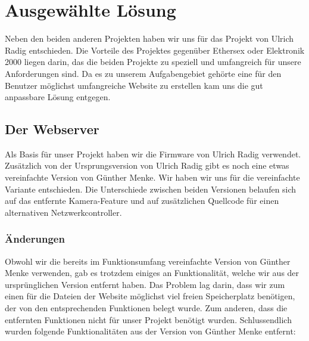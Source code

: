 \chapter{Ausgewählte Lösung}

Neben den beiden anderen Projekten haben wir uns für das Projekt von Ulrich
Radig entschieden. Die Vorteile des Projektes gegenüber Ethersex oder Elektronik
2000 liegen darin, das die beiden Projekte zu speziell und umfangreich für unsere
Anforderungen sind. Da es zu unserem Aufgabengebiet gehörte eine für den
Benutzer möglichst umfangreiche Website zu erstellen kam uns die gut anpassbare
Lösung entgegen.

\section{Der Webserver}

Als Basis für unser Projekt haben wir die Firmware von Ulrich Radig verwendet.
Zusätzlich von der Ursprungsversion von Ulrich Radig gibt es noch eine etwas
vereinfachte Version von Günther Menke. Wir haben wir uns für die vereinfachte
Variante entschieden. Die Unterschiede zwischen beiden
Versionen belaufen sich auf das entfernte Kamera-Feature und auf
zusätzlichen Quellcode für einen alternativen Netzwerkcontroller.

\subsection{Änderungen}

Obwohl wir die bereits im Funktionsumfang vereinfachte Version
von Günther Menke verwenden, gab es trotzdem einiges an Funktionalität, welche wir
aus der ursprünglichen Version entfernt haben.
Das Problem lag darin, dass wir zum einen für die Dateien der Website möglichst
viel freien Speicherplatz benötigen, der von den entsprechenden Funktionen
belegt wurde. Zum anderen, dass die entfernten Funktionen nicht für unser
Projekt benötigt wurden. Schlussendlich wurden folgende Funktionalitäten aus der Version
von Günther Menke entfernt:

